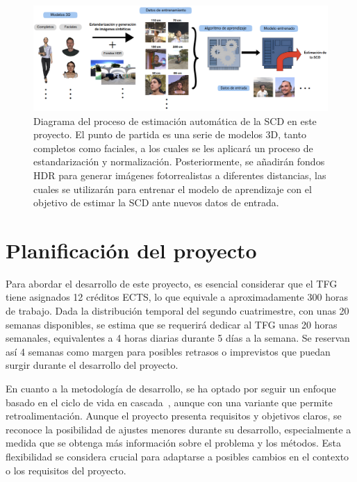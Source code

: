 \begin{figure}[h]
	\centering
	\includegraphics[scale=0.55]{imagenes/cap1/resumen.png}
	\caption[Diagrama del proyecto.]{Diagrama del proceso de estimación automática de la SCD en este proyecto. El punto de partida es una serie de modelos 3D, tanto completos como faciales, a los cuales se les aplicará un proceso de estandarización y normalización. Posteriormente, se añadirán fondos HDR para generar imágenes fotorrealistas a diferentes distancias, las cuales se utilizarán para entrenar el modelo de aprendizaje con el objetivo de estimar la SCD ante nuevos datos de entrada.}
	\label{fig3}
\end{figure}

\section{Planificación del proyecto}

Para abordar el desarrollo de este proyecto, es esencial considerar que el TFG tiene asignados 12 créditos ECTS, lo que equivale a aproximadamente 300 horas de trabajo. Dada la distribución temporal del segundo cuatrimestre, con unas 20 semanas disponibles, se estima que se requerirá dedicar al TFG unas 20 horas semanales, equivalentes a 4 horas diarias durante 5 días a la semana. Se reservan así 4 semanas como margen para posibles retrasos o imprevistos que puedan surgir durante el desarrollo del proyecto.

En cuanto a la metodología de desarrollo, se ha optado por seguir un enfoque basado en el ciclo de vida en cascada~\cite{38}, aunque con una variante que permite retroalimentación. Aunque el proyecto presenta requisitos y objetivos claros, se reconoce la posibilidad de ajustes menores durante su desarrollo, especialmente a medida que se obtenga más información sobre el problema y los métodos. Esta flexibilidad se considera crucial para adaptarse a posibles cambios en el contexto o los requisitos del proyecto.

